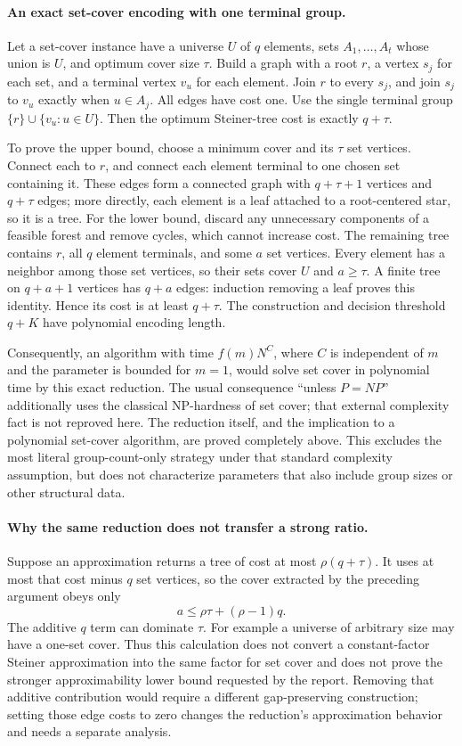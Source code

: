 \documentclass[11pt]{article}
\begin{document}
\paragraph{An exact set-cover encoding with one terminal group.}
Let a set-cover instance have a universe $U$ of $q$ elements,
sets $A_1,\ldots,A_t$ whose union is $U$, and optimum cover
size $\tau$. Build a graph with a root $r$, a vertex $s_j$
for each set, and a terminal vertex $v_u$ for each element.
Join $r$ to every $s_j$, and join $s_j$ to $v_u$ exactly
when $u\in A_j$. All edges have cost one. Use the single
terminal group $\{r\}\cup\{v_u:u\in U\}$.
Then the optimum Steiner-tree cost is exactly $q+\tau$.

To prove the upper bound, choose a minimum cover and its $\tau$
set vertices. Connect each to $r$, and connect each element terminal
to one chosen set containing it. These edges form a connected graph
with $q+\tau+1$ vertices and $q+\tau$ edges; more directly,
each element is a leaf attached to a root-centered star, so it is
a tree. For the lower bound, discard any unnecessary components
of a feasible forest and remove cycles, which cannot increase cost.
The remaining tree contains $r$, all $q$ element terminals, and
some $a$ set vertices. Every element has a neighbor among those
set vertices, so their sets cover $U$ and $a\ge\tau$.
A finite tree on $q+a+1$ vertices has $q+a$ edges: induction
removing a leaf proves this identity. Hence its cost is at least
$q+\tau$. The construction and decision threshold $q+K$ have
polynomial encoding length.

Consequently, an algorithm with time $f(m)N^C$, where $C$ is
independent of $m$ and the parameter is bounded for $m=1$,
would solve set cover in polynomial time by this exact reduction.
The usual consequence ``unless $P=NP$'' additionally uses the
classical NP-hardness of set cover; that external complexity fact
is not reproved here. The reduction itself, and the implication to
a polynomial set-cover algorithm, are proved completely above.
This excludes the most literal group-count-only strategy under that
standard complexity assumption, but does not characterize parameters
that also include group sizes or other structural data.

\paragraph{Why the same reduction does not transfer a strong ratio.}
Suppose an approximation returns a tree of cost at most
$\rho(q+\tau)$. It uses at most that cost minus $q$ set
vertices, so the cover extracted by the preceding argument obeys only
\[
a\le\rho\tau+(\rho-1)q.
\]
The additive $q$ term can dominate $\tau$. For example a universe
of arbitrary size may have a one-set cover. Thus this calculation
does not convert a constant-factor Steiner approximation into the
same factor for set cover and does not prove the stronger
approximability lower bound requested by the report.
Removing that additive contribution would require a different
gap-preserving construction; setting those edge costs to zero changes
the reduction's approximation behavior and needs a separate analysis.
\end{document}
